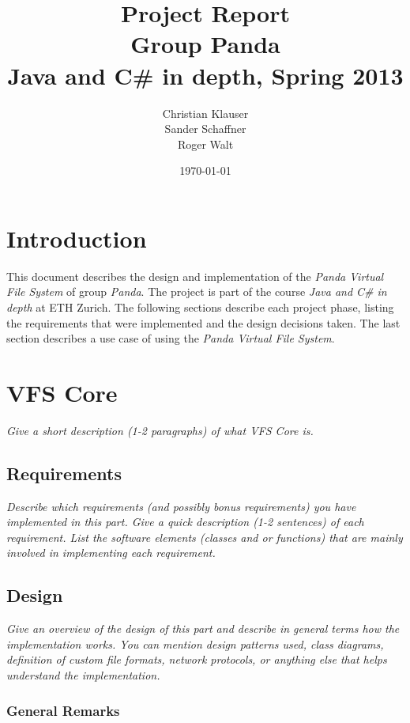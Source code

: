 \documentclass[a4paper,12pt]{article}
\title{
Project Report \\ 
Group Panda \\
\vspace{5mm}
\large Java and C\# in depth, Spring 2013
}
\author{
Christian Klauser \\
Sander Schaffner \\
Roger Walt
}
\date{\today}
\begin{document}
\maketitle

\section{Introduction}

This document describes the design and implementation of the \emph{Panda Virtual File System} of group \emph{Panda}. The project is part of the course \emph{Java and C\# in depth} at ETH Zurich. The following sections describe each project phase, listing the requirements that were implemented and the design decisions taken. The last section describes a use case of using the \emph{Panda Virtual File System}.


\section{VFS Core}

\emph{Give a short description (1-2 paragraphs) of what VFS Core is.}


\subsection{Requirements}

\emph{Describe which requirements (and possibly bonus requirements) you have implemented in this part. Give a quick description (1-2 sentences) of each requirement. List the software elements (classes and or functions) that are mainly involved in implementing each requirement.}


\subsection{Design}

\emph{Give an overview of the design of this part and describe in general terms how the implementation works. You can mention design patterns used, class diagrams, definition of custom file formats, network protocols, or anything else that helps understand the implementation.}

\subsubsection{General Remarks}
\end{document}

